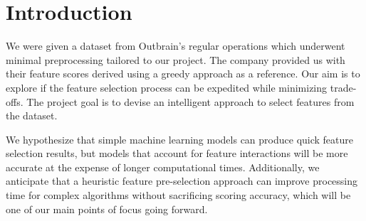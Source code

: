 \documentclass[fleqn,moreauthors,10pt]{ds_report}
\affiliation{\textit{Advisors: doc. dr. Jure Demšar, dr. Blaž Mramor, Blaž Škrlj}}
\begin{document}
\flushbottom 

\maketitle 

\thispagestyle{empty} 


\section*{Introduction}

We were given a dataset from Outbrain's regular operations which underwent minimal preprocessing tailored to our project. The company provided us with their feature scores derived using a greedy approach as a reference. Our aim is to explore if the feature selection process can be expedited while minimizing trade-offs. The project goal is to devise an intelligent approach to select features from the dataset.

We hypothesize that simple machine learning models can produce quick feature selection results, but models that account for feature interactions will be more accurate at the expense of longer computational times. Additionally, we anticipate that a heuristic feature pre-selection approach can improve processing time for complex algorithms without sacrificing scoring accuracy, which will be one of our main points of focus going forward.  

	
\end{document}
